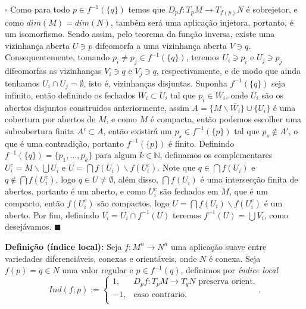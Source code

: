 \documentclass{article}
\begin{document}
	$\square$ Como para todo $p \in f^{-1}(\{q\})$ temos que $D_{p}f : T_{p}M \to T_{f(p)}N$ é sobrejetor, e como $dim(M) = dim(N)$, também será uma aplicação injetora, portanto, é um isomorfismo. Sendo assim, pelo teorema da função inversa, existe uma vizinhança aberta $U \ni p$ difeomorfa a uma vizinhança aberta $V \ni q$. Consequentemente, tomando $p_{i} \neq p_{j} \in f^{-1}(\{q\})$, teremos $U_{i} \ni p_{i}$ e $U_{j} \ni p_{j}$ difeomorfas as vizinhanças $V_{i} \ni q$ e $V_{j} \ni q$, respectivamente, e de modo que ainda tenhamos $U_{i} \cap U_{j} = \emptyset$, isto é, vizinhanças disjuntas. Suponha $f^{-1}(\{q\})$ seja infinito, então definindo os fechados $\overline{W_{i}} \subset U_{i}$ tal que $p_{i} \in \overline{W_{i}}$, onde $U_{i}$ são os abertos disjuntos construidos anteriormente, assim $A = \{M \backslash \overline{W_{i}} \} \cup \{U_{i}\}$ é uma cobertura por abertos de $M$, e como $M$ é compacta, então podemos escolher uma subcobertura finita $A' \subset A$, então existirá um $p_{s} \in f^{-1}(\{p\})$ tal que $p_{s} \notin A'$, o que é uma contradição, portanto $f^{-1}(\{p\})$ é finito. Definindo $f^{-1}(\{q\}) = \{p_{1}, \dots, p_{k}\}$ para algum $k \in \mathbb{N}$, definamos os complementares $U_{i}^{c} = M \backslash \bigcup U_{i}$ e $U = \bigcap f(U_{i}) \backslash f(U_{i}^{c})$. Note que $q \in \bigcap f(U_{i})$ e $q \notin \bigcap f(U_{i}^{c})$, logo  $q \in U \neq \emptyset$, além disso, $\bigcap f(U_{i})$ é uma intersecção finita de abertos, portanto é um aberto, e como $U_{i}^{c}$ são fechados em $M$, que é um compacto, então $f(U_{i}^{c})$ são compactos, logo $U = \bigcap f(U_{i}) \backslash f(U_{i}^{c})$ é um aberto. Por fim, definindo $V_{i} = U_{i} \cap f^{-1}(U)$ teremos $f^{-1}(U) = \bigcup V_{i}$, como desejávamos. $\blacksquare$
	
	\vspace{2 mm}
	\textbf{Definição (índice local):} Seja $f : M^{n} \to N^{n}$ uma aplicação suave entre variedades diferenciáveis, conexas e orientáveis, onde $N$ é conexa. Seja $f(p) = q \in N$ uma valor regular e $p \in f^{-1}(q)$, definimos por \textit{índice local}
	$$
	Ind(f; p) := \left\{
	\begin{array}{cc}
	1, & D_{p}f : T_{p}M \to T_{q}N \text{ preserva orient.} \\
	-1, & \text{caso contrario}.\\
	\end{array}.
	\right.
	$$
	
\end{document}

